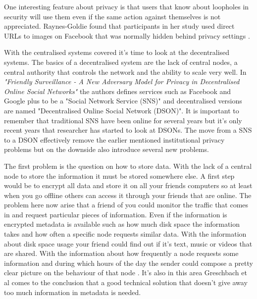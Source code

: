 One interesting feature about privacy is that users that know about loopholes in security will use them even if the same action against themselves is not appreciated.
Raynes-Goldie found that participants in her study used direct URLs to images on Facebook that was normally hidden behind privacy settings \cite{raynes-goldie2010}.

With the centralised systems covered it's time to look at the decentralised systems.
The basics of a decentralised system are the lack of central nodes, a central authority that controls the network and the ability to scale very well.
In \textit{"Friendly Surveillance - A New Adversary Model for Privacy in Decentralised Online Social Networks"} \cite{greschbach2012} the authors defines services such as Facebook and Google plus to be a "Social Network Service (SNS)" and decentralised versions are named "Decentralised Online Social Network (DSON)".
It is important to remember that traditional SNS have been online for several years but it's only recent years that researcher has started to look at DSONs.
The move from a SNS to a DSON effectively remove the earlier mentioned institutional privacy problems but on the downside also introduce several new problems.

The first problem is the question on how to store data.
With the lack of a central node to store the information it must be stored somewhere else.
A first step would be to encrypt all data and store it on all your friends computers so at least when you go offline others can access it through your friends that are online.
The problem here now arise that a friend of you could monitor the traffic that comes in and request particular pieces of information.
Even if the information is encrypted metadata is available such as how much disk space the information takes and how often a specific node requests similar data.
With the information about disk space usage your friend could find out if it's text, music or videos that are shared.
With the information about how frequently a node requests some information and during which hours of the day the sender could compose a pretty clear picture on the behaviour of that node \cite{greschbach2012}.
It's also in this area Greschbach et al \cite{greschbach2012} comes to the conclusion that a good technical solution that doesn't give away too much information in metadata is needed.

